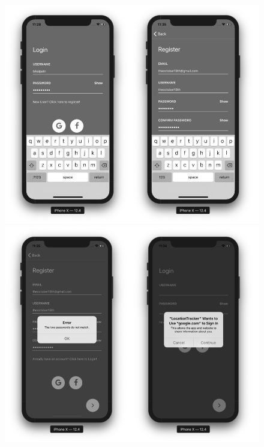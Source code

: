 \documentclass[12pt, a4paper, oneside]{article}
\begin{document}
\begin{figure}[H]
\centering
	\includegraphics[width=\linewidth]{screenshots/1.png}	
	\includegraphics[width=\linewidth]{screenshots/2.png}	
\end{figure}
\end{document}
